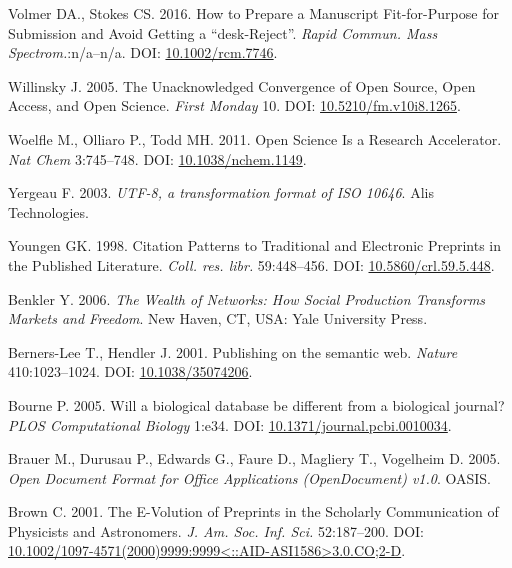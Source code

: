 \documentclass[10pt,fleqn]{wlpeerj}
\begin{document}
\hypertarget{ref-volmerux5fhowux5f2016}{}
Volmer DA., Stokes CS. 2016. How to Prepare a Manuscript Fit-for-Purpose
for Submission and Avoid Getting a ``desk-Reject''. \emph{Rapid Commun.
Mass Spectrom.}:n/a--n/a. DOI:
\href{https://doi.org/10.1002/rcm.7746}{10.1002/rcm.7746}.

\hypertarget{ref-willinskyux5funacknowledgedux5f2005}{}
Willinsky J. 2005. The Unacknowledged Convergence of Open Source, Open
Access, and Open Science. \emph{First Monday} 10. DOI:
\href{https://doi.org/10.5210/fm.v10i8.1265}{10.5210/fm.v10i8.1265}.

\hypertarget{ref-woelfleux5fopenux5f2011}{}
Woelfle M., Olliaro P., Todd MH. 2011. Open Science Is a Research
Accelerator. \emph{Nat Chem} 3:745--748. DOI:
\href{https://doi.org/10.1038/nchem.1149}{10.1038/nchem.1149}.

\hypertarget{ref-rfc3629}{}
Yergeau F. 2003. \emph{UTF-8, a transformation format of ISO 10646}.
Alis Technologies.

\hypertarget{ref-youngenux5fcitationux5f1998}{}
Youngen GK. 1998. Citation Patterns to Traditional and Electronic
Preprints in the Published Literature. \emph{Coll. res. libr.}
59:448--456. DOI:
\href{https://doi.org/10.5860/crl.59.5.448}{10.5860/crl.59.5.448}.

\hypertarget{ref-benklerux5fwealthux5f2006}{}
Benkler Y. 2006. \emph{The Wealth of Networks: How Social Production
Transforms Markets and Freedom}. New Haven, CT, USA: Yale University
Press.

\hypertarget{ref-berners-leeux5fpublishingux5f2001}{}
Berners-Lee T., Hendler J. 2001. Publishing on the semantic web.
\emph{Nature} 410:1023--1024. DOI:
\href{https://doi.org/10.1038/35074206}{10.1038/35074206}.

\hypertarget{ref-bourneux5fdatabaseux5f2005}{}
Bourne P. 2005. Will a biological database be different from a
biological journal? \emph{PLOS Computational Biology} 1:e34. DOI:
\href{https://doi.org/10.1371/journal.pcbi.0010034}{10.1371/journal.pcbi.0010034}.

\hypertarget{ref-ODF}{}
Brauer M., Durusau P., Edwards G., Faure D., Magliery T., Vogelheim D.
2005. \emph{Open Document Format for Office Applications (OpenDocument)
v1.0}. OASIS.

\hypertarget{ref-brownux5fe-volutionux5f2001}{}
Brown C. 2001. The E-Volution of Preprints in the Scholarly
Communication of Physicists and Astronomers. \emph{J. Am. Soc. Inf.
Sci.} 52:187--200. DOI:
\href{https://doi.org/10.1002/1097-4571(2000)9999:9999\%3C::AID-ASI1586\%3E3.0.CO;2-D}{10.1002/1097-4571(2000)9999:9999\textless{}::AID-ASI1586\textgreater{}3.0.CO;2-D}.
\end{document}
